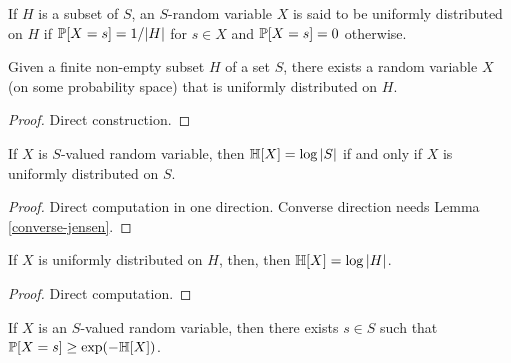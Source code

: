 \begin{definition}\label{uniform-def}\leanok
   If $H$ is a subset of $S$, an $S$-random variable $X$ is said to be uniformly distributed on $H$ if $\mathbb{P}[X = s] = 1/|H|$ for $s \in X$ and $\mathbb{P}[X=s] = 0$ otherwise.
\end{definition}

\begin{lemma}\label{unif-exist}
  \leanok
  Given a finite non-empty subset $H$ of a set $S$, there exists a random variable $X$ (on some probability space) that is uniformly distributed on $H$.
\end{lemma}

\begin{proof}\leanok Direct construction.
\end{proof}


\begin{lemma}\label{uniform-entropy}
  \leanok
  If $X$ is $S$-valued random variable, then $\mathbb{H}[X] = \log |S|$ if and only if $X$ is uniformly distributed on $S$.
\end{lemma}

\begin{proof} \leanok Direct computation in one direction.  Converse direction needs Lemma \ref{converse-jensen}.
\end{proof}

\begin{lemma}\label{uniform-entropy-II}
  \leanok
  If $X$ is uniformly distributed on $H$, then, then $\mathbb{H}[X] = \log |H|$.
\end{lemma}

\begin{proof} Direct computation.
\end{proof}

\begin{lemma}\label{bound-conc}
  \leanok
  If $X$ is an $S$-valued random variable, then there exists $s \in S$ such that $\mathbb{P}[X=s] \geq \exp(-\mathbb{H}[X])$.
\end{lemma}

